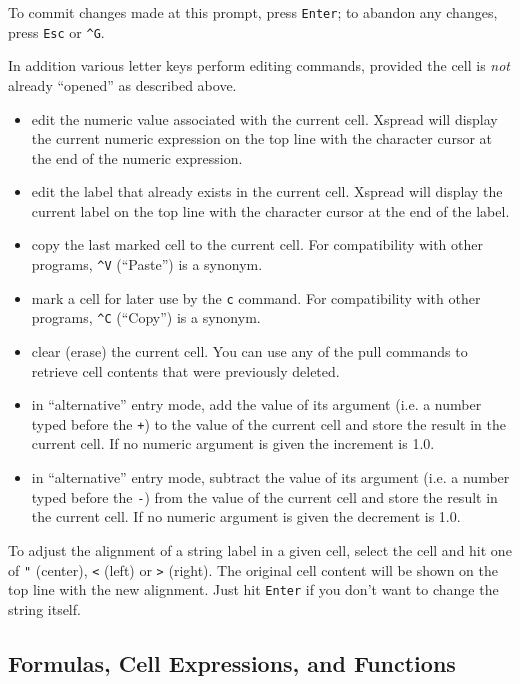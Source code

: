 \documentclass[titlepage]{article}
\newcommand{\titem}[1]{\item[{\tt #1}]}
\newcommand{\ctrl}[1]{\texttt{\^{}#1}}
\begin{document}
To commit changes made at this prompt, press \texttt{Enter}; to
abandon any changes, press \texttt{Esc} or \ctrl{G}.

In addition various letter keys perform editing commands, provided the
cell is \textit{not} already ``opened'' as described above.

\begin{itemize}

  \titem{e} edit the numeric value associated with the current cell.
    \textsf{Xspread} will display the current numeric expression on
    the top line with the character cursor at the end of the numeric
    expression.  

  \titem{E} edit the label that already exists in the current cell.
    \textsf{Xspread} will display the current label on the top line
    with the character cursor at the end of the label.  
  
    \titem{c} copy the last marked cell to the current cell.  For
    compatibility with other programs, \ctrl{V} (``Paste'') is a
    synonym.
  
    \titem{m} mark a cell for later use by the \texttt{c} command.
    For compatibility with other programs, \ctrl{C} (``Copy'') is
    a synonym.
  
  \titem{x} clear (erase) the current cell.  You can use any of the
    pull commands to retrieve cell contents that were previously
    deleted.
  
    \titem{+} in ``alternative'' entry mode, add the value of its
    argument (i.e. a number typed before the \texttt{+}) to the value
    of the current cell and store the result in the current cell.
    If no numeric argument is given the increment is 1.0.
  
    \titem{-} in ``alternative'' entry mode, subtract the value of its
    argument (i.e. a number typed before the \texttt{-}) from the value
    of the current cell and store the result in the current cell.
    If no numeric argument is given the decrement is 1.0.

\end{itemize}

To adjust the alignment of a string label in a given cell, select the
cell and hit one of \texttt{"} (center), \texttt{<} (left) or
\texttt{>} (right).  The original cell content will be shown on the
top line with the new alignment.  Just hit \texttt{Enter} if you don't
want to change the string itself.

\subsection{Formulas, Cell Expressions, and Functions}
\end{document}
